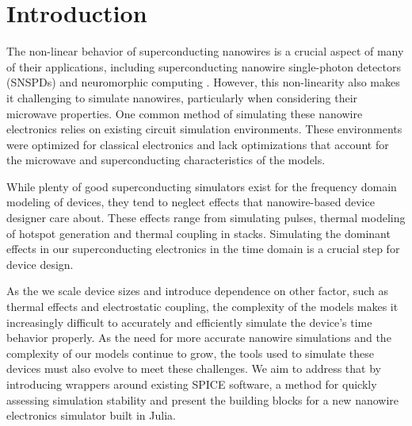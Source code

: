 \documentclass[]{article}
\begin{document}


\tableofcontents

\newpage


\section{Introduction}

The non-linear behavior of superconducting nanowires is a crucial aspect of many of their applications, including superconducting nanowire single-photon detectors (SNSPDs) and neuromorphic computing \cite{snspd_original_paper, spiking_nn}. However, this non-linearity also makes it challenging to simulate nanowires, particularly when considering their microwave properties. One common method of simulating these nanowire electronics relies on existing circuit simulation environments. These environments were optimized for classical electronics and lack optimizations that account for the microwave and superconducting characteristics of the models.

While plenty of good superconducting simulators exist for the frequency domain
modeling of devices, they tend to neglect effects that nanowire-based device 
designer care about. These effects range from simulating pulses, thermal modeling
of hotspot generation and thermal coupling in stacks.
Simulating the dominant effects in our superconducting electronics in the time domain
is a crucial step for device design.

As the we scale device sizes and introduce dependence on other factor, such as thermal effects and electrostatic coupling, the complexity of the models makes it increasingly difficult to accurately and efficiently simulate the device's time behavior properly.
As the need for more accurate nanowire simulations and the complexity of our models continue to grow, the tools used to simulate these devices must also evolve to meet these challenges. We aim to address that
by introducing wrappers around existing SPICE software, a method for quickly
assessing simulation stability and present the building blocks for a new
nanowire electronics simulator built in Julia.
\end{document}
